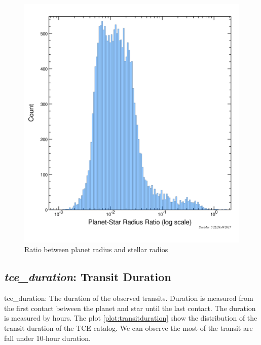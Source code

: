 \begin{figure}[!h]
\begin{center}
        \includegraphics[width=0.5\textheight]{img/planet_star_radius_ratio.png}
        \caption{Ratio between planet radius and stellar radios}  \label{plot:planet_star_radius_ratio}
\end{center}
\end{figure}

\subsection{\emph{tce\_duration}:  Transit Duration}
tce\_duration: The duration of the observed transits. Duration is measured from the first contact between the planet and star until the last contact. The duration is measured by hours. The plot \ref{plot:transitduration} show the distribution of the transit duration of the TCE catalog. We can observe the most of the transit are fall under 10-hour duration.

